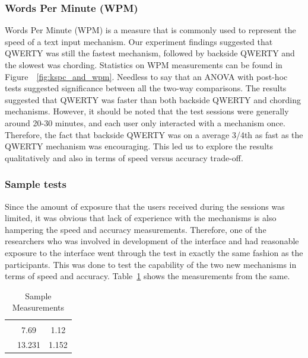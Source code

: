 \subsubsection{Words Per Minute (WPM)}

Words Per Minute (WPM) is a measure that is commonly used to represent
the speed of a text input mechanism. Our experiment findings suggested
that QWERTY was still the fastest mechanism, followed by backside
QWERTY and the slowest was chording. Statistics on WPM measurements
can be found in Figure~~\ref{fig:kspc_and_wpm}. Needless to say that an ANOVA with post-hoc tests suggested significance between all the two-way comparisons. The results suggested
that QWERTY was faster than both backside QWERTY and chording
mechanisms. However, it should be noted that the test sessions were
generally around 20-30 minutes, and each user only interacted with a
mechanism once. Therefore, the fact that backside QWERTY was on a
average 3/4th as fast as the QWERTY mechanism was encouraging. This
led us to explore the results qualitatively and also in terms of speed
versus accuracy trade-off.


\subsubsection{Sample tests}

Since the amount of exposure that the users received during the
sessions was limited, it was obvious that lack of experience with the
mechanisms is also hampering the speed and accuracy
measurements. Therefore, one of the researchers who was involved in
development of the interface and had reasonable exposure to the
interface went through the test in exactly the same fashion as the
participants. This was done to test the capability of the two new
mechanisms in terms of speed and
accuracy. Table~\ref{tab:StatisticsForTestCorpora} shows the
measurements from the same.

\begin{table}
	\centering
		\begin{tabular}{rcc} 
		                         & \color{grey}{WPM}    & \color{grey}{KSPC} \\ 
                   \color{grey}{Chording} & 7.69   & 1.12 \\ 
                   \color{grey}{Backside QWERTY} & 13.231 & 1.152 \\ 
		\end{tabular}
	\caption{Sample Measurements}
	\label{tab:StatisticsForTestCorpora}
\end{table}

